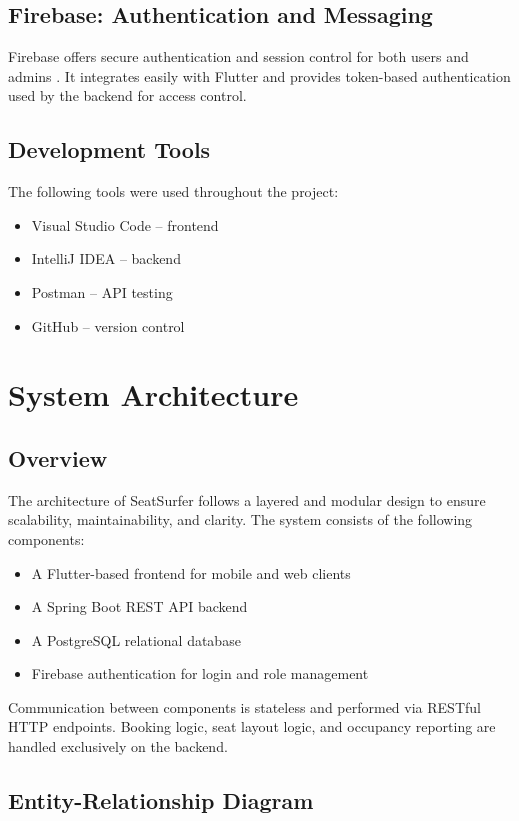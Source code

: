 \documentclass[12pt,a4paper]{report}
\begin{document}
\section{Firebase: Authentication and Messaging}
Firebase offers secure authentication and session control for both users and admins \cite{firebase}. It integrates easily with Flutter and provides token-based authentication used by the backend for access control.

\section{Development Tools}
The following tools were used throughout the project:
\begin{itemize}
    \item Visual Studio Code – frontend
    \item IntelliJ IDEA – backend
    \item Postman – API testing
    \item GitHub – version control
\end{itemize}

\chapter{System Architecture}

\section{Overview}

The architecture of SeatSurfer follows a layered and modular design to ensure scalability, maintainability, and clarity. The system consists of the following components:
\begin{itemize}
    \item A Flutter-based frontend for mobile and web clients
    \item A Spring Boot REST API backend
    \item A PostgreSQL relational database
    \item Firebase authentication for login and role management
\end{itemize}

Communication between components is stateless and performed via RESTful HTTP endpoints. Booking logic, seat layout logic, and occupancy reporting are handled exclusively on the backend.

\section{Entity-Relationship Diagram}
\end{document}
